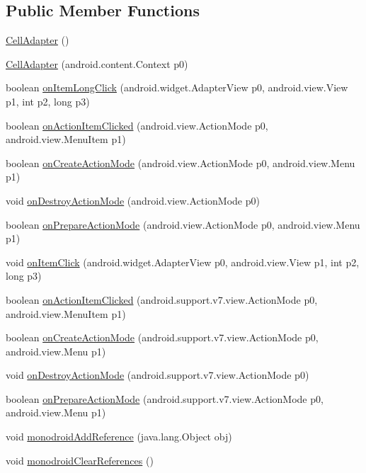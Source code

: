 \subsection*{Public Member Functions}
\begin{CompactItemize}
\item 
\hyperlink{classmd5b60ffeb829f638581ab2bb9b1a7f4f3f_1_1_cell_adapter_11e7e08e3dca364c58b1875ad43bd0ef}{CellAdapter} ()
\item 
\hyperlink{classmd5b60ffeb829f638581ab2bb9b1a7f4f3f_1_1_cell_adapter_cc33c5de6c2168e85cfed4b8b631a7f7}{CellAdapter} (android.content.Context p0)
\item 
boolean \hyperlink{classmd5b60ffeb829f638581ab2bb9b1a7f4f3f_1_1_cell_adapter_6315b61158f9e22013a511c7edd6bcdc}{onItemLongClick} (android.widget.AdapterView p0, android.view.View p1, int p2, long p3)
\item 
boolean \hyperlink{classmd5b60ffeb829f638581ab2bb9b1a7f4f3f_1_1_cell_adapter_1febf1cc030736547768ae04d9ae8a8b}{onActionItemClicked} (android.view.ActionMode p0, android.view.MenuItem p1)
\item 
boolean \hyperlink{classmd5b60ffeb829f638581ab2bb9b1a7f4f3f_1_1_cell_adapter_4a8ad9014d454fbe0396726ba6b20b4b}{onCreateActionMode} (android.view.ActionMode p0, android.view.Menu p1)
\item 
void \hyperlink{classmd5b60ffeb829f638581ab2bb9b1a7f4f3f_1_1_cell_adapter_2c4b1f2ec74b292e21fd9c665ba8ee1d}{onDestroyActionMode} (android.view.ActionMode p0)
\item 
boolean \hyperlink{classmd5b60ffeb829f638581ab2bb9b1a7f4f3f_1_1_cell_adapter_51d520fe6621a42e3dc8c690d1e763c0}{onPrepareActionMode} (android.view.ActionMode p0, android.view.Menu p1)
\item 
void \hyperlink{classmd5b60ffeb829f638581ab2bb9b1a7f4f3f_1_1_cell_adapter_be81186ab9094ff7ddd3f969e015a2e2}{onItemClick} (android.widget.AdapterView p0, android.view.View p1, int p2, long p3)
\item 
boolean \hyperlink{classmd5b60ffeb829f638581ab2bb9b1a7f4f3f_1_1_cell_adapter_49e5cfeb93c21213d2f7962e65898a5e}{onActionItemClicked} (android.support.v7.view.ActionMode p0, android.view.MenuItem p1)
\item 
boolean \hyperlink{classmd5b60ffeb829f638581ab2bb9b1a7f4f3f_1_1_cell_adapter_f5577bc64f0be210f22a89792a8be639}{onCreateActionMode} (android.support.v7.view.ActionMode p0, android.view.Menu p1)
\item 
void \hyperlink{classmd5b60ffeb829f638581ab2bb9b1a7f4f3f_1_1_cell_adapter_8d6a0075be883243c54327d203a8d575}{onDestroyActionMode} (android.support.v7.view.ActionMode p0)
\item 
boolean \hyperlink{classmd5b60ffeb829f638581ab2bb9b1a7f4f3f_1_1_cell_adapter_ba7bba2fe00d346e064e9ff1f742296f}{onPrepareActionMode} (android.support.v7.view.ActionMode p0, android.view.Menu p1)
\item 
void \hyperlink{classmd5b60ffeb829f638581ab2bb9b1a7f4f3f_1_1_cell_adapter_59b12b00e8c034309892498bbef078d4}{monodroidAddReference} (java.lang.Object obj)
\item 
void \hyperlink{classmd5b60ffeb829f638581ab2bb9b1a7f4f3f_1_1_cell_adapter_ad3dc816719d492f2fa5de60860e45e7}{monodroidClearReferences} ()
\end{CompactItemize}
